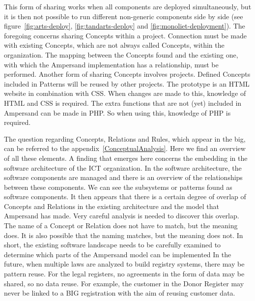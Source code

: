 This form of sharing works when all components are deployed simultaneously, but it is then not possible to run different non-generic components side by side (see figure~\ref{fig:arts-deploy}, \ref{fig:tandarts-deploy} and \ref{fig:monoliet-deployment}).
The foregoing concerns sharing Concepts within a project.
Connection must be made with existing Concepts, which are not always called Concepts, within the organization.
The mapping between the Concepts found and the existing one, with which the Ampersand implementation has a relationship, must be performed.
Another form of sharing Concepts involves projects.
Defined Concepts included in Patterns will be reused by other projects.
The prototype is an HTML website in combination with CSS.
When changes are made to this, knowledge of HTML and CSS is required.
The extra functions that are not (yet) included in Ampersand can be made in PHP.
So when using this, knowledge of PHP is required.


The question regarding Concepts, Relations and Rules, which appear in the \acrshort{big}, can be referred to the appendix~\ref{ConceptualAnalysis}.
Here we find an overview of all these elements.
A finding that emerges here concerns the embedding in the software architecture of the ICT organization.
In the software architecture, the software components are managed and there is an overview of the relationships between these components.
We can see the subsystems or patterns found as software components.
It then appears that there is a certain degree of overlap of Concepts and Relations in the existing architecture and the model that Ampersand has made.
Very careful analysis is needed to discover this overlap.
The name of a Concept or Relation does not have to match, but the meaning does.
It is also possible that the naming matches, but the meaning does not.
In short, the existing software landscape needs to be carefully examined to determine which parts of the Ampersand model can be implemented
In the future, when multiple laws are analyzed to build registry systems, there may be pattern reuse.
For the legal registers, no agreements in the form of data may be shared, so no data reuse.
For example, the customer in the Donor Register may never be linked to a BIG registration with the aim of reusing customer data.

